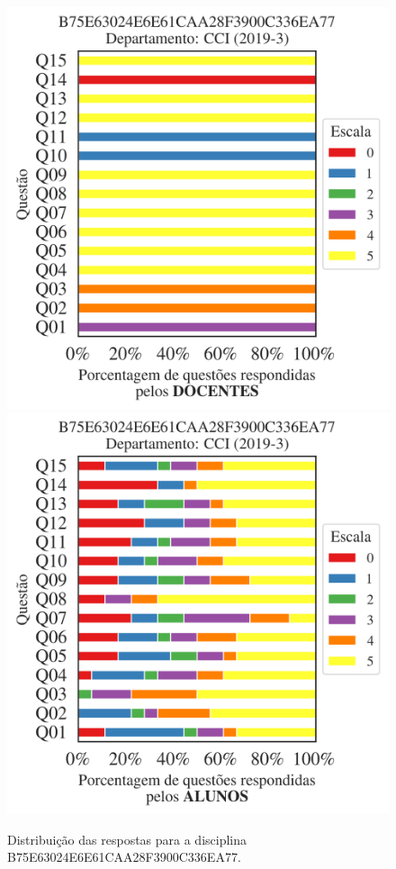\documentclass[a4paper,10pt]{article}
\begin{document}
\begin{figure}[h]
\centering
\includegraphics[width=0.485\linewidth]{analise_disciplina_departamento_CCI_B75E63024E6E61CAA28F3900C336EA77_docentes.png}
\includegraphics[width=0.485\linewidth]{analise_disciplina_departamento_CCI_B75E63024E6E61CAA28F3900C336EA77_alunos.png}
\caption{\label{fig:analise_geral_departamento}                Distribuição das respostas para a disciplina B75E63024E6E61CAA28F3900C336EA77. }
\end{figure}
\end{document}
